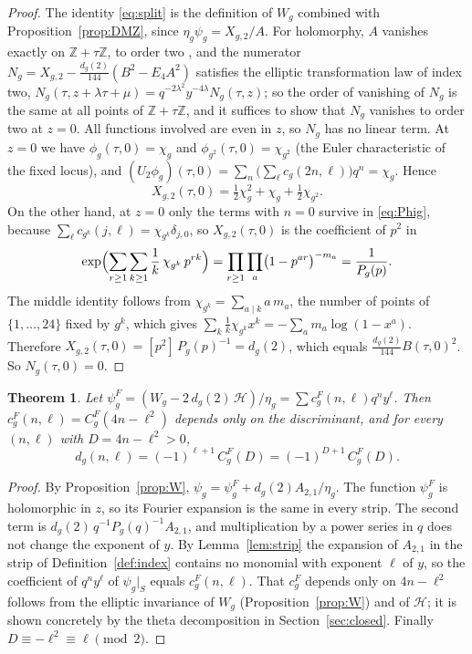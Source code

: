 \documentclass[11pt]{amsart}
\newtheorem{theorem}{Theorem}[section]
\theoremstyle{definition}
\newcommand{\ZZ}{\mathbb{Z}}
\newcommand{\cH}{\mathcal H}
\begin{document}
\begin{proof}
The identity \eqref{eq:split} is the definition of $W_g$ combined with Proposition~\ref{prop:DMZ}, since $\eta_g\psi_g=X_{g,2}/A$. For holomorphy, $A$ vanishes exactly on $\ZZ+\tau\ZZ$, to order two \cite[Theorem~9.3]{EZ85}, and the numerator $N_g=X_{g,2}-\frac{d_g(2)}{144}(B^2-E_4A^2)$ satisfies the elliptic transformation law of index two, $N_g(\tau,z+\lambda\tau+\mu)=q^{-2\lambda^2}y^{-4\lambda}N_g(\tau,z)$; so the order of vanishing of $N_g$ is the same at all points of $\ZZ+\tau\ZZ$, and it suffices to show that $N_g$ vanishes to order two at $z=0$. All functions involved are even in $z$, so $N_g$ has no linear term. At $z=0$ we have $\phi_g(\tau,0)=\chi_g$ and $\phi_{g^2}(\tau,0)=\chi_{g^2}$ (the Euler characteristic of the fixed locus), and $(U_2\phi_g)(\tau,0)=\sum_n\bigl(\sum_\ell c_g(2n,\ell)\bigr)q^n=\chi_g$. Hence
\[
X_{g,2}(\tau,0)=\tfrac12\chi_g^2+\chi_g+\tfrac12\chi_{g^2}.
\]
On the other hand, at $z=0$ only the terms with $n=0$ survive in \eqref{eq:Phig}, because $\sum_\ell c_{g^k}(j,\ell)=\chi_{g^k}\delta_{j,0}$, so $X_{g,2}(\tau,0)$ is the coefficient of $p^2$ in
\[
\exp\Bigl(\sum_{r\ge1}\sum_{k\ge1}\frac1k\,\chi_{g^k}\,p^{rk}\Bigr)=\prod_{r\ge1}\prod_a\bigl(1-p^{ar}\bigr)^{-m_a}=\frac{1}{P_g(p)}.
\]
The middle identity follows from $\chi_{g^k}=\sum_{a\mid k}a\,m_a$, the number of points of $\{1,\dots,24\}$ fixed by $g^k$, which gives $\sum_k\frac1k\chi_{g^k}x^k=-\sum_am_a\log(1-x^a)$. Therefore $X_{g,2}(\tau,0)=[p^2]\,P_g(p)^{-1}=d_g(2)$, which equals $\frac{d_g(2)}{144}B(\tau,0)^2$. So $N_g(\tau,0)=0$.
\end{proof}

\begin{theorem}\label{thm:finite}
Let $\psi^F_g=(W_g-2\,d_g(2)\,\cH)/\eta_g=\sum c^F_g(n,\ell)q^ny^\ell$. Then $c^F_g(n,\ell)=C^F_g(4n-\ell^2)$ depends only on the discriminant, and for every $(n,\ell)$ with $D=4n-\ell^2>0$,
\[
d_g(n,\ell)=(-1)^{\ell+1}\,C^F_g(D)=(-1)^{D+1}\,C^F_g(D).
\]
\end{theorem}

\begin{proof}
By Proposition~\ref{prop:W}, $\psi_g=\psi^F_g+d_g(2)A_{2,1}/\eta_g$. The function $\psi^F_g$ is holomorphic in $z$, so its Fourier expansion is the same in every strip. The second term is $d_g(2)\,q^{-1}P_g(q)^{-1}A_{2,1}$, and multiplication by a power series in $q$ does not change the exponent of $y$. By Lemma~\ref{lem:strip} the expansion of $A_{2,1}$ in the strip of Definition~\ref{def:index} contains no monomial with exponent $\ell$ of $y$, so the coefficient of $q^ny^\ell$ of $\psi_g|_S$ equals $c^F_g(n,\ell)$. That $c^F_g$ depends only on $4n-\ell^2$ follows from the elliptic invariance of $W_g$ (Proposition~\ref{prop:W}) and of $\cH$; it is shown concretely by the theta decomposition in Section~\ref{sec:closed}. Finally $D\equiv-\ell^2\equiv\ell\pmod2$.
\end{proof}
\end{document}
